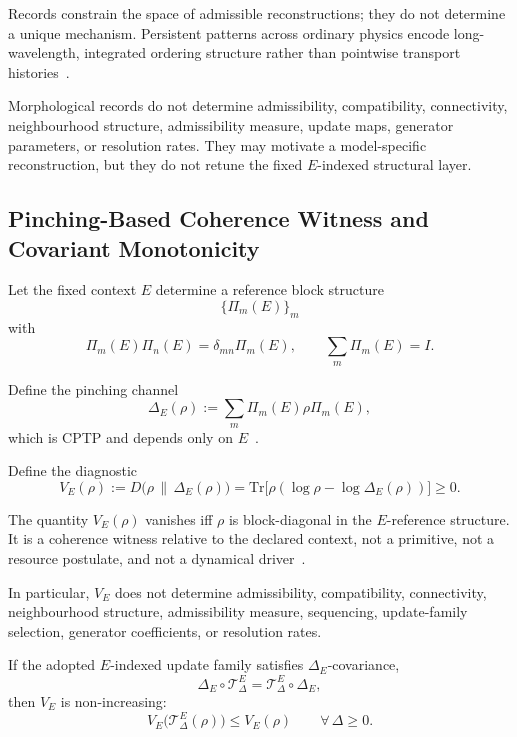 \documentclass[aps,prx,onecolumn,11pt]{revtex4-2}
\theoremstyle{plain}
\theoremstyle{definition}
\theoremstyle{remark}
\begin{document}
Records constrain the space of admissible reconstructions; they do not
determine a unique mechanism. Persistent patterns across ordinary
physics encode long-wavelength, integrated ordering structure rather
than pointwise transport histories~\cite{Bagnold1941,Hooke2005,
BinneyTremaine2008,LinShu1964}.

Morphological records do not determine admissibility, compatibility,
connectivity, neighbourhood structure, admissibility measure, update
maps, generator parameters, or resolution rates. They may motivate a
model-specific reconstruction, but they do not retune the fixed
\(E\)-indexed structural layer.

\subsection{Pinching-Based Coherence Witness and Covariant Monotonicity}
\label{app:pinching_coherence_witness}

Let the fixed context \(E\) determine a reference block structure
\[
\{\Pi_m(E)\}_m
\]
with
\[
\Pi_m(E)\Pi_n(E)=\delta_{mn}\Pi_m(E),
\qquad
\sum_m\Pi_m(E)=I.
\]

Define the pinching channel
\begin{equation}
\Delta_E(\rho)
:=
\sum_m
\Pi_m(E)\rho\Pi_m(E),
\label{eq:app_pinching_channel}
\end{equation}
which is CPTP and depends only on
\(E\)~\cite{Kraus1983,Watrous2018}.

Define the diagnostic
\begin{equation}
V_E(\rho)
:=
D\!\bigl(\rho\,\|\,\Delta_E(\rho)\bigr)
=
\mathrm{Tr}\bigl[
\rho(\log\rho-\log\Delta_E(\rho))
\bigr]
\geq 0.
\label{eq:app_V_relative_entropy_record}
\end{equation}

The quantity \(V_E(\rho)\) vanishes iff \(\rho\) is block-diagonal in
the \(E\)-reference structure. It is a coherence witness relative to
the declared context, not a primitive, not a resource postulate, and not
a dynamical driver~\cite{Baumgratz2014,ChitambarGour2019}.

In particular, \(V_E\) does not determine admissibility,
compatibility, connectivity, neighbourhood structure, admissibility
measure, sequencing, update-family selection, generator coefficients,
or resolution rates.

If the adopted \(E\)-indexed update family satisfies
\(\Delta_E\)-covariance,
\begin{equation}
\Delta_E\circ\mathcal{T}^E_\Delta
=
\mathcal{T}^E_\Delta\circ\Delta_E,
\label{eq:app_dephasing_covariance}
\end{equation}
then \(V_E\) is non-increasing:
\begin{equation}
V_E\bigl(\mathcal{T}^E_\Delta(\rho)\bigr)
\leq
V_E(\rho)
\qquad
\forall\,\Delta\geq 0.
\label{eq:app_V_contractivity}
\end{equation}
\end{document}
